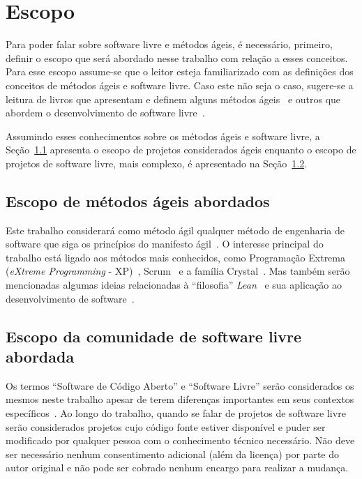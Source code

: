 \chapter{Escopo}
\label{cap:escopo}

Para poder falar sobre software livre e métodos ágeis, é necessário,
primeiro, definir o escopo que será abordado nesse trabalho com
relação a esses conceitos. Para esse escopo assume-se que o leitor
esteja familiarizado com as definições dos conceitos de métodos ágeis
e software livre. Caso este não seja o caso, sugere-se a leitura de
livros que apresentam e definem alguns métodos
ágeis~\cite{XP01,Cockburn2002,Schwaber2004} e outros que abordem o
desenvolvimento de software
livre~\cite{Raymond1999,Fogel2005,Goldman2005}.

Assumindo esses conhecimentos sobre os métodos ágeis e software livre,
a Seção~\ref{sec:agile-def} apresenta o escopo de projetos
considerados ágeis enquanto o escopo de projetos de software livre,
mais complexo, é apresentado na Seção~\ref{sec:os-def}.

\section{Escopo de métodos ágeis abordados}
\label{sec:agile-def}

Este trabalho considerará como método ágil qualquer método de
engenharia de software que siga os princípios do manifesto
ágil~\cite{AgileManifesto}. O interesse principal do trabalho está
ligado aos métodos mais conhecidos, como Programação Extrema
(\emph{eXtreme Programming} - XP)~\cite{XP02},
Scrum~\cite{Schwaber2004} e a família Crystal~\cite{Cockburn2002}. Mas
também serão mencionadas algumas ideias relacionadas à ``filosofia''
\emph{Lean}~\cite{Ohno1998} e sua aplicação ao desenvolvimento de
software~\cite{Poppendieck2005}.

\section{Escopo da comunidade de software livre abordada}
\label{sec:os-def}

Os termos ``Software de Código Aberto'' e ``Software Livre'' serão
considerados os mesmos neste trabalho apesar de terem diferenças
importantes em seus contextos específicos~\cite[Ch. 1, Free Versus
Open source]{Fogel2005}. Ao longo do trabalho, quando se falar de
projetos de software livre serão considerados projetos cujo código
fonte estiver disponível e puder ser modificado por qualquer pessoa
com o conhecimento técnico necessário. Não deve ser necessário nenhum
consentimento adicional (além da licença) por parte do autor original
e não pode ser cobrado nenhum encargo para realizar a mudança.

